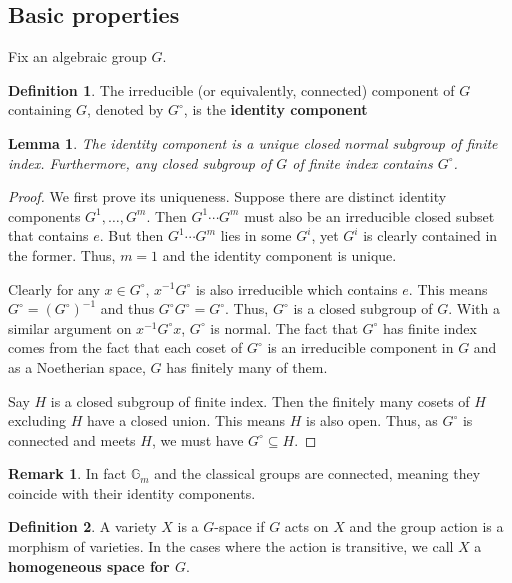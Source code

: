 \documentclass[12pt]{article}
\newtheorem{lemma}{Lemma}[section]
\theoremstyle{remark}
\theoremstyle{definition}
\newtheorem{remark}{Remark}[section]
\newtheorem{definition}{Definition}[section]
\newcommand{\G}[0]{\mathbb{G}}
\begin{document}
    \subsection{Basic properties}
    Fix an algebraic group $G$.
    \begin{definition}
        The irreducible (or equivalently, connected) component of $G$ containing $G$, denoted by $G^\circ$, is the \textbf{identity component}
    \end{definition}
    \begin{lemma}
        The identity component is a unique closed normal subgroup of finite index. Furthermore, any closed subgroup of $G$ of finite index contains $G^\circ$.
    \end{lemma}
    \begin{proof}
        We first prove its uniqueness. Suppose there are distinct identity components $G^1,\dots, G^m$. Then $G^1\cdots G^m$ must also be an irreducible closed subset that contains $e$. But then $G^1\cdots G^m$ lies in some $G^i$, yet $G^i$ is clearly contained in the former. Thus, $m=1$ and the identity component is unique.

        Clearly for any $x\in G^\circ$, $x^{-1}G^\circ$ is also irreducible which contains $e$. This means $G^\circ=(G^\circ)^{-1}$ and thus $G^\circ G^\circ=G^\circ$. Thus, $G^\circ$ is a closed subgroup of $G$. With a similar argument on $x^{-1}G^\circ x$, $G^\circ$ is normal. The fact that $G^\circ$ has finite index comes from the fact that each coset of $G^\circ$ is an irreducible component in $G$ and as a Noetherian space, $G$ has finitely many of them.

        Say $H$ is a closed subgroup of finite index. Then the finitely many cosets of $H$ excluding $H$ have a closed union. This means $H$ is also open. Thus, as $G^\circ$ is connected and meets $H$, we must have $G^\circ \subseteq H$.
    \end{proof}
    \begin{remark}
        In fact $\G_m$ and the classical groups are connected, meaning they coincide with their identity components.
    \end{remark}
    \begin{definition}
        A variety $X$ is a $G$-space if $G$ acts on $X$ and the group action is a morphism of varieties. In the cases where the action is transitive, we call $X$ a \textbf{homogeneous space for $G$}.
    \end{definition}
\end{document}

